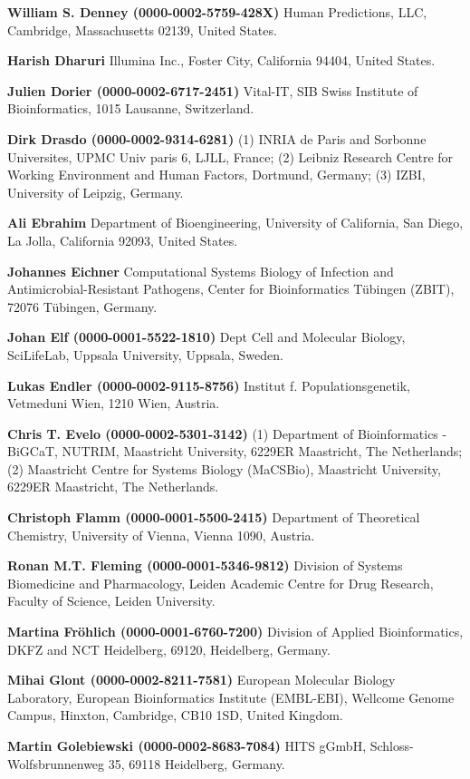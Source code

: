 \documentclass{sbml-paper}
\begin{document}
\textbf{William S. Denney (0000-0002-5759-428X)} Human Predictions, LLC, Cambridge, Massachusetts 02139, United States.

\textbf{Harish Dharuri} Illumina Inc., Foster City, California 94404, United States.

\textbf{Julien Dorier (0000-0002-6717-2451)} Vital-IT, SIB Swiss Institute of Bioinformatics, 1015 Lausanne, Switzerland.

\textbf{Dirk Drasdo (0000-0002-9314-6281)} (1) INRIA de Paris and Sorbonne Universites, UPMC Univ paris 6, LJLL, France; (2) Leibniz Research Centre for Working Environment and Human Factors, Dortmund, Germany; (3) IZBI, University of Leipzig, Germany.

\textbf{Ali Ebrahim} Department of Bioengineering, University of California, San Diego, La Jolla, California 92093, United States.

\textbf{Johannes Eichner} Computational Systems Biology of Infection and Antimicrobial-Resistant Pathogens, Center for Bioinformatics Tübingen (ZBIT), 72076 Tübingen, Germany.

\textbf{Johan Elf (0000-0001-5522-1810)} Dept Cell and Molecular Biology, SciLifeLab, Uppsala University, Uppsala, Sweden.

\textbf{Lukas Endler (0000-0002-9115-8756)} Institut f. Populationsgenetik, Vetmeduni  Wien, 1210 Wien, Austria.

\textbf{Chris T. Evelo (0000-0002-5301-3142)} (1) Department of Bioinformatics - BiGCaT, NUTRIM, Maastricht University, 6229ER Maastricht, The Netherlands; (2) Maastricht Centre for Systems Biology (MaCSBio), Maastricht University, 6229ER Maastricht, The Netherlands.

\textbf{Christoph Flamm (0000-0001-5500-2415)} Department of Theoretical Chemistry, University of Vienna, Vienna 1090, Austria.

\textbf{Ronan M.T. Fleming (0000-0001-5346-9812)} Division of Systems Biomedicine and Pharmacology, Leiden Academic Centre for Drug Research, Faculty of Science, Leiden University.

\textbf{Martina Fröhlich (0000-0001-6760-7200)} Division of Applied Bioinformatics, DKFZ and NCT Heidelberg, 69120, Heidelberg, Germany.

\textbf{Mihai Glont (0000-0002-8211-7581)} European Molecular Biology Laboratory, European Bioinformatics Institute (EMBL-EBI), Wellcome Genome Campus, Hinxton, Cambridge, CB10 1SD, United Kingdom.

\textbf{Martin Golebiewski (0000-0002-8683-7084)} HITS gGmbH, Schloss-Wolfsbrunnenweg 35, 69118 Heidelberg, Germany.
\end{document}
